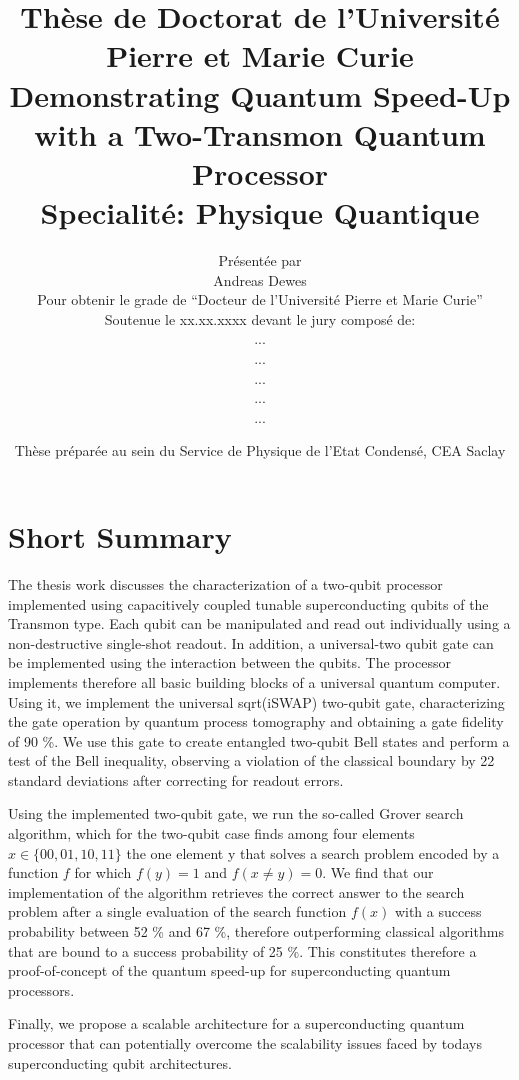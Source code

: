 \documentclass[12pt]{book}
\title{\normalsize Thèse de Doctorat de l'Université Pierre et Marie Curie \\ \huge Demonstrating Quantum Speed-Up with a Two-Transmon Quantum Processor \\ \normalsize Specialité: Physique Quantique}
\author{Présentée par \bigskip \\ \bigskip \huge Andreas Dewes \\ \small Pour obtenir le grade de ``Docteur de l'Université Pierre et Marie Curie'' \vspace{3cm} \\ Soutenue le xx.xx.xxxx devant le jury composé de: \\ ... \\ ... \\ ... \\ ... \\ ...}
\date{\vspace{2cm} Thèse préparée au sein du Service de Physique de l'Etat Condensé, CEA Saclay}
\theoremstyle{definition}
\begin{document}
\pagestyle{plain}

\maketitle

\tableofcontents



\pagestyle{fancy}

\chapter*{Short Summary}

The thesis work discusses the characterization of a two-qubit processor implemented using capacitively coupled tunable superconducting qubits of the Transmon type. Each qubit can be manipulated and read out individually using a non-destructive single-shot readout. In addition, a universal-two qubit gate can be implemented using the interaction between the qubits. The processor implements therefore all basic building blocks of a universal quantum computer. Using it, we implement the universal sqrt(iSWAP) two-qubit gate, characterizing the gate operation by quantum process tomography and obtaining a gate fidelity of 90 \%. We use this gate to create entangled two-qubit Bell states and perform a test of the Bell inequality, observing a violation of the classical boundary by 22 standard deviations after correcting for readout errors. 

\smallskip

Using the implemented two-qubit gate, we run the so-called Grover search algorithm, which for the two-qubit case finds among four elements $x \in \{00,01,10,11\}$ the one element y that solves a search problem encoded by a function $f$ for which $f(y)=1$ and $f(x\ne y)=0$. We find that our implementation of the algorithm retrieves the correct answer to the search problem after a single evaluation of the search function $f(x)$ with a success probability between 52 \% and 67 \%, therefore outperforming classical algorithms that are bound to a success probability of 25 \%. This constitutes therefore a proof-of-concept of the quantum speed-up for superconducting quantum processors.

\smallskip

Finally, we propose a scalable architecture for a superconducting quantum processor that can potentially overcome the scalability issues faced by todays superconducting qubit architectures.
\end{document}
